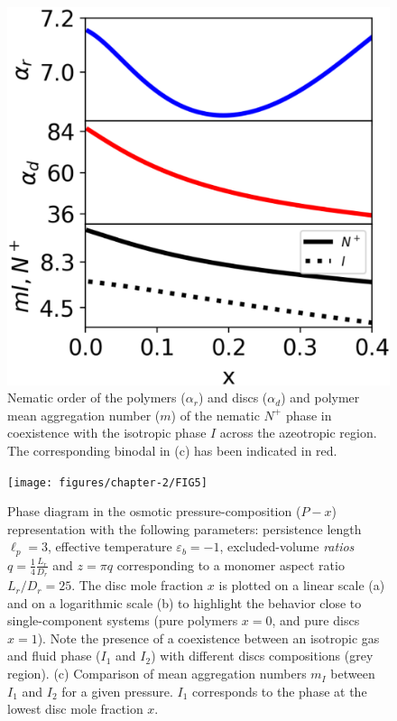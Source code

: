 \begin{figure}
  \includegraphics[width= .5\linewidth]{figures/chapter-2/FIG4}
\caption[Nematic order of the polymers ($\alpha_{r}$) and discs ($\alpha_{d}$) and polymer mean aggregation number ($m$) of  the nematic $N^{+}$ phase]{Nematic order of the polymers ($\alpha_{r}$) and discs ($\alpha_{d}$) and polymer mean aggregation number ($m$) of  the nematic $N^{+}$ phase in coexistence with the isotropic phase $I$  across the azeotropic region. The corresponding binodal in (c) has been indicated in red. }
  \label{fig:azeotrope}
\end{figure}

\begin{figure}[ht]
  \texttt{[image: figures/chapter-2/FIG5]}
\caption[Phase diagram in the osmotic pressure-composition ($P-x$) representation with the following parameters:]{Phase diagram in the osmotic pressure-composition ($P-x$) representation with the following parameters: persistence length $\ell_{p} = 3$, effective temperature $\varepsilon_{b} = -1$, excluded-volume {\em ratios} $q = \frac{1}{4}\frac{L_{r}}{D_{r}}$ and $z=\pi q$ corresponding to a monomer aspect ratio $L_{r}/D_{r} =25$. The disc mole fraction $x$ is plotted on a linear scale (a) and on a logarithmic scale (b) to highlight the behavior close to single-component systems (pure polymers $x=0$, and pure discs $x=1$). Note the presence of a coexistence between an isotropic gas and fluid  phase ($I_1$ and $I_2$) with different discs compositions (grey region). (c) Comparison of mean aggregation numbers $m_{I}$ between $I_{1}$ and $I_{2}$ for a given pressure. $I_{1}$ corresponds to the phase at the lowest disc mole fraction $x$. }
  \label{fig:coexistence}
\end{figure}

